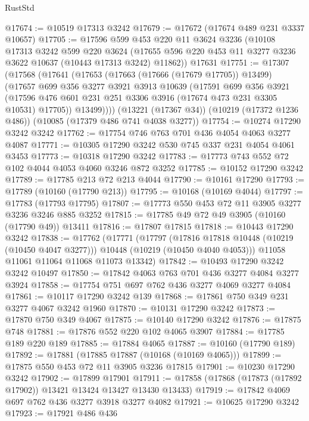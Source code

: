 \begin{lexlean}{RustStd}
\begin{coremodule}
@17674 := @10519 @17313 @3242
@17679 := @17672 (@17674 @489 @231 @3337 @10657)
@17705 := @17596
    @599
    @453
    @220
    @11
    @3624
    @3236
    (@10108
      @17313
      @3242
      @599
      @220
      @3624
      (@17655 @596 @220 @453 @11 @3277 @3236 @3622 @10637 (@10443 @17313 @3242) @11862))
    @17631
@17751 := @17307
    (@17568
      (@17641
        (@17653
          (@17663 (@17666 (@17679 @17705)) @13499)
          (@17657
            @699
            @356
            @3277
            @3921
            @3913
            @10639
            (@17591
              @699
              @356
              @3921
              (@17596 @476 @601 @231 @251 @3306 @3916 (@17674 @473 @231 @3305 @10531) @17705))
            @13499))))
    (@13221 (@17367 @34))
    (@10219 (@17372 @1236 @486))
    (@10085 (@17379 @486 @741 @4038 @3277))
@17754 := @10274 @17290 @3242 @3242
@17762 := @17754 @746 @763 @701 @436 @4054 @4063 @3277 @4087
@17771 := @10305 @17290 @3242 @530 @745 @337 @231 @4054 @4061 @3453
@17773 := @10318 @17290 @3242
@17783 := @17773 @743 @552 @72 @102 @4044 @4053 @4060 @3246 @872 @3252
@17785 := @10152 @17290 @3242
@17789 := @17785 @213 @72 @213 @4044
@17790 := @10161 @17290
@17793 := @17789 (@10160 (@17790 @213))
@17795 := @10168 (@10169 @4044)
@17797 := @17783 (@17793 @17795)
@17807 := @17773 @550 @453 @72 @11 @3905 @3277 @3236 @3246 @885 @3252
@17815 := @17785 @49 @72 @49 @3905 (@10160 (@17790 @49)) @13411
@17816 := @17807 @17815
@17818 := @10443 @17290 @3242
@17838 := @17762
    (@17771
      (@17797
        (@17816 @17818 @10448 (@10219 (@10450 @4047 @3277)))
        @10448
        (@10219 (@10450 @4040 @4053)))
      @11058
      @11061
      @11064
      @11068
      @11073
      @13342)
@17842 := @10493 @17290 @3242 @3242 @10497
@17850 := @17842 @4063 @763 @701 @436 @3277 @4084 @3277 @3924
@17858 := @17754 @751 @697 @762 @436 @3277 @4069 @3277 @4084
@17861 := @10117 @17290 @3242 @139
@17868 := @17861 @750 @349 @231 @3277 @4067 @3242 @1960
@17870 := @10131 @17290 @3242
@17873 := @17870 @750 @349 @4067
@17875 := @10140 @17290 @3242
@17876 := @17875 @748
@17881 := @17876 @552 @220 @102 @4065 @3907
@17884 := @17785 @189 @220 @189
@17885 := @17884 @4065
@17887 := @10160 (@17790 @189)
@17892 := @17881 (@17885 @17887 (@10168 (@10169 @4065)))
@17899 := @17875 @550 @453 @72 @11 @3905 @3236 @17815
@17901 := @10230 @17290 @3242
@17902 := @17899 @17901
@17911 := @17858 (@17868 (@17873 (@17892 @17902)) @13421 @13424 @13427 @13430 @13433)
@17919 := @17842 @4069 @697 @762 @436 @3277 @3918 @3277 @4082
@17921 := @10625 @17290 @3242
@17923 := @17921 @486 @436

\end{coremodule}
\end{lexlean}
